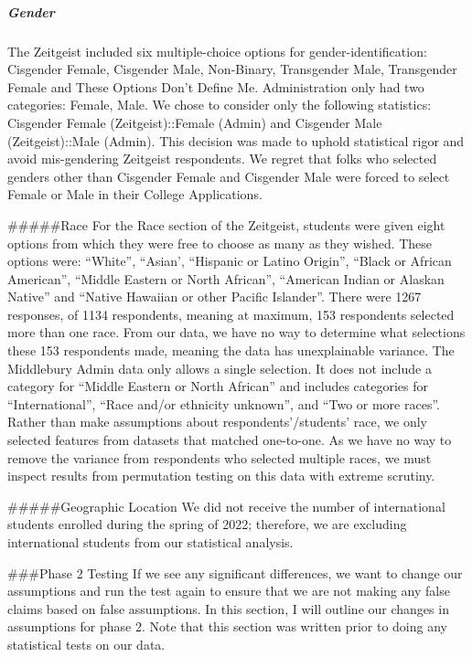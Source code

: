 \documentclass[
]{article}
\begin{document}
\hypertarget{gender}{%
\subparagraph{Gender}\label{gender}}

The Zeitgeist included six multiple-choice options for
gender-identification: Cisgender Female, Cisgender Male, Non-Binary,
Transgender Male, Transgender Female and These Options Don't Define Me.
Administration only had two categories: Female, Male. We chose to
consider only the following statistics: Cisgender Female
(Zeitgeist)::Female (Admin) and Cisgender Male (Zeitgeist)::Male
(Admin). This decision was made to uphold statistical rigor and avoid
mis-gendering Zeitgeist respondents. We regret that folks who selected
genders other than Cisgender Female and Cisgender Male were forced to
select Female or Male in their College Applications.

\#\#\#\#\#Race For the Race section of the Zeitgeist, students were
given eight options from which they were free to choose as many as they
wished. These options were: ``White'', ``Asian', ``Hispanic or Latino
Origin'', ``Black or African American'', ``Middle Eastern or North
African'', ``American Indian or Alaskan Native'' and ``Native Hawaiian
or other Pacific Islander''. There were 1267 responses, of 1134
respondents, meaning at maximum, 153 respondents selected more than one
race. From our data, we have no way to determine what selections these
153 respondents made, meaning the data has unexplainable variance. The
Middlebury Admin data only allows a single selection. It does not
include a category for ``Middle Eastern or North African'' and includes
categories for ``International'', ``Race and/or ethnicity unknown'', and
``Two or more races''. Rather than make assumptions about
respondents'/students' race, we only selected features from datasets
that matched one-to-one. As we have no way to remove the variance from
respondents who selected multiple races, we must inspect results from
permutation testing on this data with extreme scrutiny.

\#\#\#\#\#Geographic Location We did not receive the number of
international students enrolled during the spring of 2022; therefore, we
are excluding international students from our statistical analysis.

\#\#\#Phase 2 Testing If we see any significant differences, we want to
change our assumptions and run the test again to ensure that we are not
making any false claims based on false assumptions. In this section, I
will outline our changes in assumptions for phase 2. Note that this
section was written prior to doing any statistical tests on our data.
\end{document}
